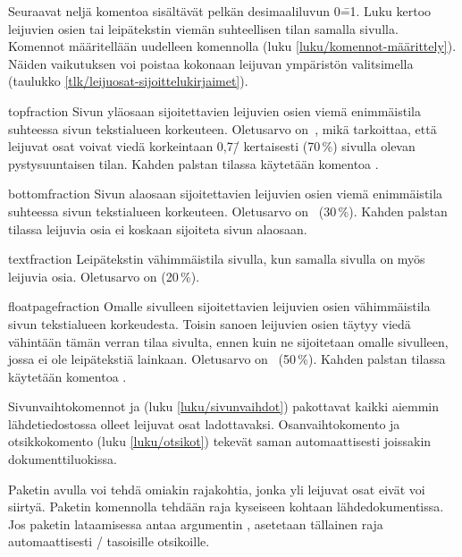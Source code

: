 Seuraavat neljä komentoa sisältävät pelkän desimaaliluvun 0\==1. Luku
kertoo leijuvien osien tai leipätekstin viemän suhteellisen tilan
samalla sivulla. Komennot määritellään uudelleen komennolla
 (luku \ref{luku/komennot-määrittely}). Näiden
vaikutuksen voi poistaa kokonaan leijuvan ympäristön valitsimella
\koodi{!} (taulukko \ref{tlk/leijuosat-sijoittelukirjaimet}).

\begin{maaritelma}{}
\item [topfraction] Sivun yläosaan sijoitettavien leijuvien osien viemä
  enimmäistila suhteessa sivun tekstialueen korkeuteen. Oletusarvo
  on~, mikä tarkoittaa, että leijuvat osat voivat viedä
  korkeintaan 0,7\=/ kertaisesti (70\,\%) sivulla olevan pystysuuntaisen
  tilan. Kahden palstan tilassa käytetään komentoa
  .
\item [bottomfraction] Sivun alaosaan sijoitettavien leijuvien osien
  viemä enimmäistila suhteessa sivun tekstialueen korkeuteen. Oletusarvo
  on~ (30\,\%). Kahden palstan tilassa leijuvia osia ei
  koskaan sijoiteta sivun alaosaan.
\item [textfraction] Leipätekstin vähimmäistila sivulla, kun samalla
  sivulla on myös leijuvia osia. Oletusarvo on  (20\,\%).
\item [floatpagefraction] Omalle sivulleen sijoitettavien leijuvien
  osien vähimmäistila sivun tekstialueen korkeudesta. Toisin sanoen
  leijuvien osien täytyy viedä vähintään tämän verran tilaa sivulta,
  ennen kuin ne sijoitetaan omalle sivulleen, jossa ei ole leipätekstiä
  lainkaan. Oletusarvo on~ (50\,\%). Kahden palstan tilassa
  käytetään komentoa .
\end{maaritelma}

Sivunvaihtokomennot  ja 
(luku \ref{luku/sivunvaihdot}) pakottavat kaikki aiemmin
lähdetiedostossa olleet leijuvat osat ladottavaksi. Osanvaihtokomento
 ja otsikkokomento  (luku
\ref{luku/otsikot}) tekevät saman automaattisesti joissakin
dokumenttiluokissa.

Paketin  avulla voi tehdä omiakin
rajakohtia, jonka yli leijuvat osat eivät voi siirtyä. Paketin
komennolla  tehdään raja kyseiseen kohtaan
lähdedokumentissa. Jos paketin lataamisessa antaa argumentin
, asetetaan tällainen raja automaattisesti
\-/ tasoisille otsikoille.

